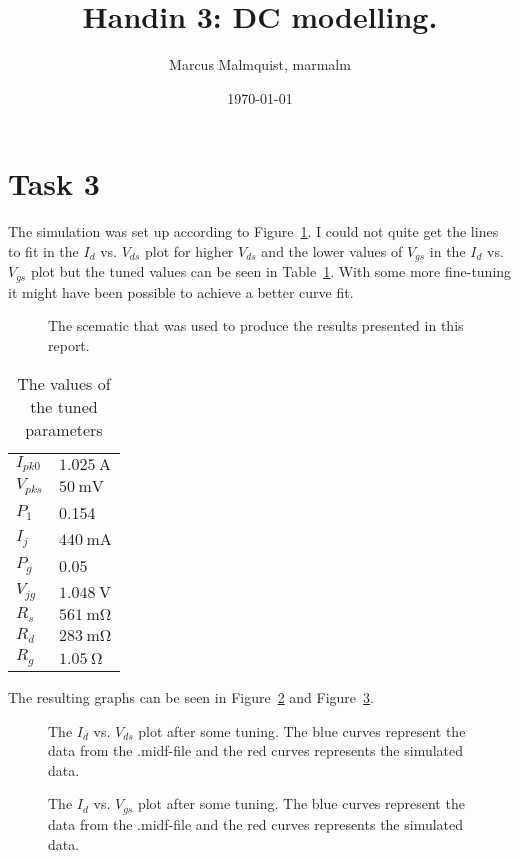 \documentclass[12pt,a4paper]{article}
\title{Handin 3: DC modelling.}
\author{Marcus Malmquist, marmalm}
\date{\today}
\begin{document}
\maketitle

\section{Task 3}\label{sec:1}
The simulation was set up according to Figure~\ref{fig:scematic}. I could not quite get the lines to fit in the $I_d$ vs. $V_{ds}$ plot for higher $V_{ds}$ and the lower values of $V_{gs}$ in the $I_d$ vs. $V_{gs}$ plot but the tuned values can be seen in Table~\ref{tab:tuned}. With some more fine-tuning it might have been possible to achieve a better curve fit.
\begin{figure}[h]
  \centering
  \noindent{}
  \caption{The scematic that was used to produce the results presented in this report.}
  \label{fig:scematic}
\end{figure}
\begin{table}[h]
  \centering
  \begin{tabular}{|l|l|}\hline
    $I_{pk0}$ & $\SI{1.025}{\ampere}$ \\
    $V_{pks}$ & $\SI{50}{\milli\volt}$ \\
    $P_1$ & 0.154 \\
    $I_j$ & $\SI{440}{\milli\ampere}$ \\
    $P_g$ & 0.05 \\
    $V_{jg}$ & $\SI{1.048}{\volt}$ \\
    $R_s$ & $\SI{561}{\milli\ohm}$ \\
    $R_d$ & $\SI{283}{\milli\ohm}$ \\
    $R_g$ & $\SI{1.05}{\ohm}$ \\ \hline
  \end{tabular}
  \caption{The values of the tuned parameters}
  \label{tab:tuned}
\end{table}

The resulting graphs can be seen in Figure~\ref{fig:id_vds} and Figure~\ref{fig:id_vgs}.
\begin{figure}[h]
  \centering
  \noindent{}
  \caption{The $I_d$ vs. $V_{ds}$ plot after some tuning. The blue curves represent the data from the .midf-file and the red curves represents the simulated data.}
  \label{fig:id_vds}
\end{figure}
\begin{figure}[h]
  \centering
  \noindent{}
  \caption{The $I_d$ vs. $V_{gs}$ plot after some tuning. The blue curves represent the data from the .midf-file and the red curves represents the simulated data.}
  \label{fig:id_vgs}
\end{figure}
\end{document}
